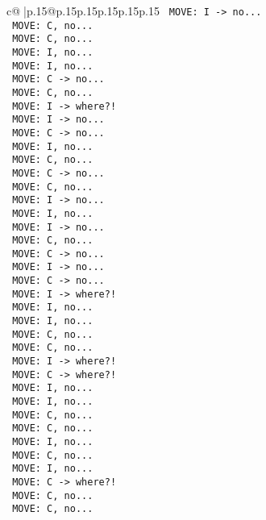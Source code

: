 \documentclass{article}
\begin{document}
{\begin{supertabular}{c@{$\;$}|p{.15\linewidth}@{}p{.15\linewidth}p{.15\linewidth}p{.15\linewidth}p{.15\linewidth}p{.15\linewidth}}
{{{\texttt{ MOVE: I {-}> no...} \\
\texttt{ MOVE: C, no...} \\
\texttt{ MOVE: C, no...} \\
\texttt{ MOVE: I, no...} \\
\texttt{ MOVE: I, no...} \\
\texttt{ MOVE: C {-}> no...} \\
\texttt{ MOVE: C, no...} \\
\texttt{ MOVE: I {-}> where?!} \\
\texttt{ MOVE: I {-}> no...} \\
\texttt{ MOVE: C {-}> no...} \\
\texttt{ MOVE: I, no...} \\
\texttt{ MOVE: C, no...} \\
\texttt{ MOVE: C {-}> no...} \\
\texttt{ MOVE: C, no...} \\
\texttt{ MOVE: I {-}> no...} \\
\texttt{ MOVE: I, no...} \\
\texttt{ MOVE: I {-}> no...} \\
\texttt{ MOVE: C, no...} \\
\texttt{ MOVE: C {-}> no...} \\
\texttt{ MOVE: I {-}> no...} \\
\texttt{ MOVE: C {-}> no...} \\
\texttt{ MOVE: I {-}> where?!} \\
\texttt{ MOVE: I, no...} \\
\texttt{ MOVE: I, no...} \\
\texttt{ MOVE: C, no...} \\
\texttt{ MOVE: C, no...} \\
\texttt{ MOVE: I {-}> where?!} \\
\texttt{ MOVE: C {-}> where?!} \\
\texttt{ MOVE: I, no...} \\
\texttt{ MOVE: I, no...} \\
\texttt{ MOVE: C, no...} \\
\texttt{ MOVE: C, no...} \\
\texttt{ MOVE: I, no...} \\
\texttt{ MOVE: C, no...} \\
\texttt{ MOVE: I, no...} \\
\texttt{ MOVE: C {-}> where?!} \\
\texttt{ MOVE: C, no...} \\
\texttt{ MOVE: C, no...} \\
}}}
\end{supertabular}}
\end{document}

